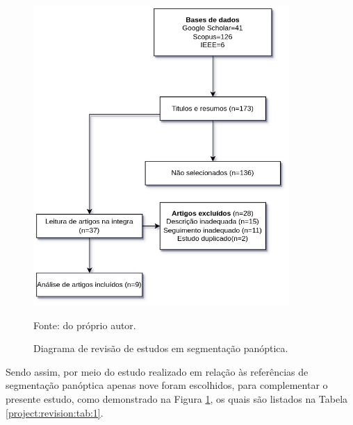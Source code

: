 \begin{figure}[H]
    \centering
    \caption{Diagrama de revisão de estudos em segmentação panóptica.}
    \includegraphics[height=4.5in]{recursos/imagens/project/revisao_panoptica.png}
    \label{project:revision:fig:1}

    Fonte: do próprio autor.
\end{figure}

Sendo assim, por meio do estudo realizado em relação às referências de segmentação panóptica apenas nove foram escolhidos, para complementar o presente estudo, como demonstrado na Figura \ref{project:revision:fig:1}, os quais são listados na Tabela \ref{project:revision:tab:1}.

